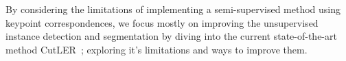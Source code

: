 By considering the limitations of implementing a semi-supervised method using keypoint correspondences, we focus mostly on improving the unsupervised instance detection and segmentation by diving into the current state-of-the-art method CutLER~\cite{wang2023cut}; exploring it's limitations and ways to improve them.
 



